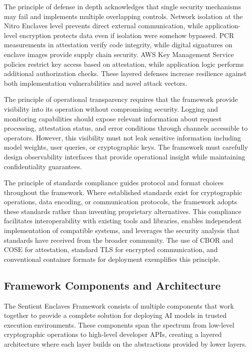 The principle of defense in depth acknowledges that single security mechanisms may fail and implements multiple overlapping controls. Network isolation at the Nitro Enclaves level prevents direct external communication, while application-level encryption protects data even if isolation were somehow bypassed. PCR measurements in attestation verify code integrity, while digital signatures on enclave images provide supply chain security. AWS Key Management Service policies restrict key access based on attestation, while application logic performs additional authorization checks. These layered defenses increase resilience against both implementation vulnerabilities and novel attack vectors.

The principle of operational transparency requires that the framework provide visibility into its operation without compromising security. Logging and monitoring capabilities should expose relevant information about request processing, attestation status, and error conditions through channels accessible to operators. However, this visibility must not leak sensitive information including model weights, user queries, or cryptographic keys. The framework must carefully design observability interfaces that provide operational insight while maintaining confidentiality guarantees.

The principle of standards compliance guides protocol and format choices throughout the framework. Where established standards exist for cryptographic operations, data encoding, or communication protocols, the framework adopts these standards rather than inventing proprietary alternatives. This compliance facilitates interoperability with existing tools and libraries, enables independent implementation of compatible systems, and leverages the security analysis that standards have received from the broader community. The use of CBOR and COSE for attestation, standard TLS for encrypted communication, and conventional container formats for deployment exemplifies this principle.

\subsection{Framework Components and Architecture}

The Sentient Enclaves Framework consists of multiple components that work together to provide a complete solution for deploying AI models in trusted execution environments. These components span the spectrum from low-level cryptographic operations to high-level developer APIs, creating a layered architecture where each layer builds on the abstractions provided by lower layers.

